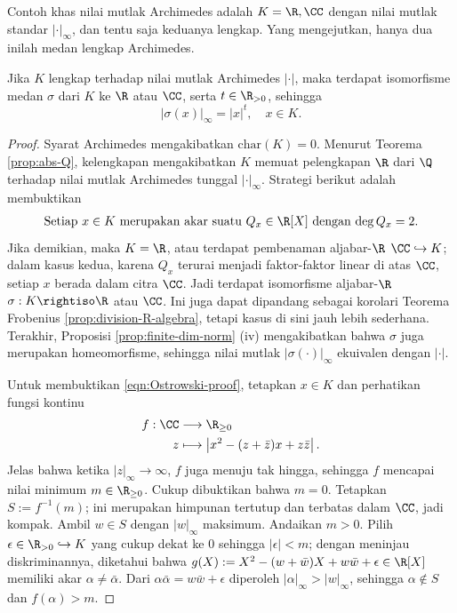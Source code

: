 Contoh khas nilai mutlak Archimedes adalah $K=\R, \CC$ dengan nilai mutlak standar $|\cdot|_\infty$, dan tentu saja keduanya lengkap. Yang mengejutkan, hanya dua inilah medan lengkap Archimedes.
\begin{theorem}[A.\ Ostrowski]\label{prop:archimedean-complete-field}
	Jika $K$ lengkap terhadap nilai mutlak Archimedes $|\cdot|$, maka terdapat isomorfisme medan $\sigma$ dari $K$ ke $\R$ atau $\CC$, serta $t \in \R_{>0}$, sehingga
	\[ |\sigma(x)|_\infty = |x|^t, \quad x \in K. \]
\end{theorem}
\begin{proof}
	Syarat Archimedes mengakibatkan $\text{char}(K)=0$. Menurut Teorema \ref{prop:abs-Q}, kelengkapan mengakibatkan $K$ memuat pelengkapan $\R$ dari $\Q$ terhadap nilai mutlak Archimedes tunggal $|\cdot|_\infty$. Strategi berikut adalah membuktikan
	\begin{gather}\label{eqn:Ostrowski-proof}
		\text{Setiap $x \in K$ merupakan akar suatu $Q_x \in \R[X]$ dengan $\deg Q_x = 2$.}
	\end{gather}
	Jika demikian, maka $K=\R$, atau terdapat pembenaman aljabar-$\R$ $\CC \hookrightarrow K$; dalam kasus kedua, karena $Q_x$ terurai menjadi faktor-faktor linear di atas $\CC$, setiap $x$ berada dalam citra $\CC$. Jadi terdapat isomorfisme aljabar-$\R$ $\sigma: K \rightiso \R$ atau $\CC$. Ini juga dapat dipandang sebagai korolari Teorema Frobenius \ref{prop:division-R-algebra}, tetapi kasus di sini jauh lebih sederhana. Terakhir, Proposisi \ref{prop:finite-dim-norm} (iv) mengakibatkan bahwa $\sigma$ juga merupakan homeomorfisme, sehingga nilai mutlak $|\sigma(\cdot)|_\infty$ ekuivalen dengan $|\cdot|$.

	Untuk membuktikan \eqref{eqn:Ostrowski-proof}, tetapkan $x \in K$ dan perhatikan fungsi kontinu
	\begin{align*}
		f: \CC & \longrightarrow \R_{\geq 0} \\
		z & \longmapsto \left| x^2 - (z + \bar{z}) x + z\bar{z} \right|.
	\end{align*}
	Jelas bahwa ketika $|z|_\infty \to \infty$, $f$ juga menuju tak hingga, sehingga $f$ mencapai nilai minimum $m \in \R_{\geq 0}$. Cukup dibuktikan bahwa $m=0$. Tetapkan $S := f^{-1}(m)$; ini merupakan himpunan tertutup dan terbatas dalam $\CC$, jadi kompak. Ambil $w \in S$ dengan $|w|_\infty$ maksimum. Andaikan $m > 0$. Pilih $\epsilon \in \R_{>0} \hookrightarrow K$ yang cukup dekat ke $0$ sehingga $|\epsilon| < m$; dengan meninjau diskriminannya, diketahui bahwa $g(X) := X^2 - (w+\bar{w})X +w\bar{w} + \epsilon \in \R[X]$ memiliki akar $\alpha \neq \bar{\alpha}$. Dari $\alpha\bar{\alpha} = w\bar{w}+\epsilon$ diperoleh $|\alpha|_\infty > |w|_\infty$, sehingga $\alpha \notin S$ dan $f(\alpha) > m$.
	

\end{proof}
